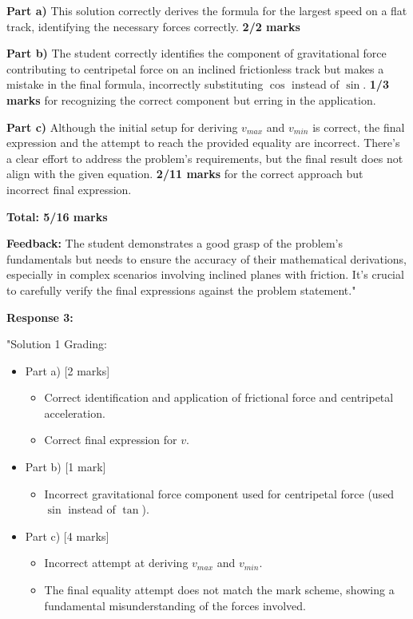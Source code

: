 \documentclass[a4paper,11pt]{article}
\begin{document}
\textbf{Part a)} This solution correctly derives the formula for the largest speed on a flat track, identifying the necessary forces correctly. \textbf{2/2 marks}

\textbf{Part b)} The student correctly identifies the component of gravitational force contributing to centripetal force on an inclined frictionless track but makes a mistake in the final formula, incorrectly substituting \( \cos \) instead of \( \sin \). \textbf{1/3 marks} for recognizing the correct component but erring in the application.

\textbf{Part c)} Although the initial setup for deriving \( v_{max} \) and \( v_{min} \) is correct, the final expression and the attempt to reach the provided equality are incorrect. There's a clear effort to address the problem's requirements, but the final result does not align with the given equation. \textbf{2/11 marks} for the correct approach but incorrect final expression.

\textbf{Total: 5/16 marks}

\textbf{Feedback:} The student demonstrates a good grasp of the problem's fundamentals but needs to ensure the accuracy of their mathematical derivations, especially in complex scenarios involving inclined planes with friction. It's crucial to carefully verify the final expressions against the problem statement."

\textbf{Response 3:}

"Solution 1 Grading:

\begin{itemize}
    \item Part a) [2 marks]
    \begin{itemize}
        \item Correct identification and application of frictional force and centripetal acceleration.
        \item Correct final expression for \(v\).
    \end{itemize}
    \item Part b) [1 mark]
    \begin{itemize}
        \item Incorrect gravitational force component used for centripetal force (used \( \sin \) instead of \( \tan \)).
    \end{itemize}
    \item Part c) [4 marks]
    \begin{itemize}
        \item Incorrect attempt at deriving \( v_{max} \) and \( v_{min} \).
        \item The final equality attempt does not match the mark scheme, showing a fundamental misunderstanding of the forces involved.
    \end{itemize}
\end{itemize}
\end{document}
